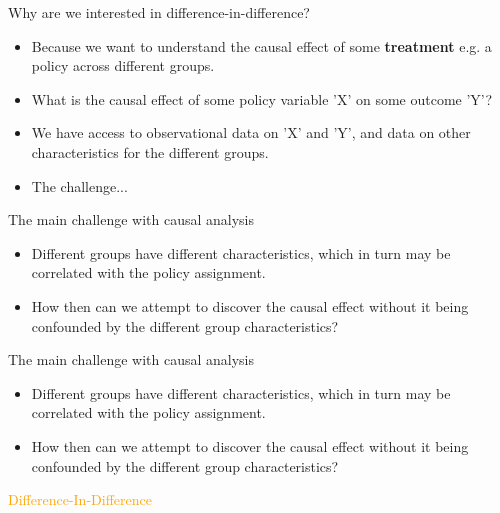 \documentclass[notes,11pt, aspectratio=169]{beamer}
\begin{document}
\begin{frame}{Why are we interested in difference-in-difference?}
    \begin{itemize}
        \item Because we want to understand the causal effect of some \textbf{treatment} e.g. a policy across different groups.
        \item What is the causal effect of some policy variable 'X' on some outcome 'Y'?
        \item We have access to observational data on 'X' and 'Y', and data on other characteristics for the different groups.
        \item The challenge...
    \end{itemize}
\end{frame}

\begin{frame}{The main challenge with causal analysis}
    \begin{itemize}
        \item Different groups have different characteristics, which in turn may be correlated with the policy assignment.
        \item How then can we attempt to discover the causal effect without it being confounded by the different group characteristics?
    \end{itemize}
\end{frame}

\begin{frame}{The main challenge with causal analysis}
    \begin{itemize}
        \item Different groups have different characteristics, which in turn may be correlated with the policy assignment.
        \item How then can we attempt to discover the causal effect without it being confounded by the different group characteristics? 
    \end{itemize}
    \flushright
    \vspace{1cm}
    \textcolor{orange}{\huge{Difference-In-Difference}}
\end{frame}
\end{document}
